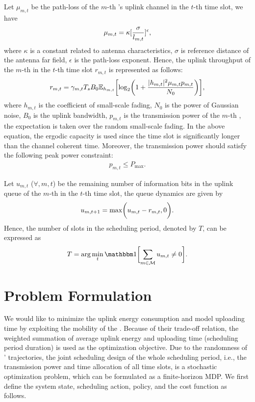 Let $\mu_{m,t}$ be the path-loss of the $m$-th {\IAV}'s uplink channel in the $t$-th time slot, we have
\begin{align*}
    \mu_{m,t} = \kappa [ \frac{ \sigma }{ l_{m,t} } ]^{\epsilon},
\end{align*}
where $\kappa$ is a constant related to antenna characteristics, $\sigma$ is reference distance of the antenna far field, $\epsilon$ is the path-loss exponent.
Hence, the uplink throughput of the $m$-th {\IAV} in the $t$-th time slot $r_{m,t}$ is represented as follows:
\begin{align}
    r_{m,t} = \gamma_{m,t} T_s B_0
    \mathbb{E}_{h_{m,t}} \Bracket{
        \log_{2}\Paren{ 1 + \frac{|h_{m,t}|^2 \mu_{m,t} p_{m,t}}{N_0} }
    },
    \label{eqn:vu}
\end{align}
where $h_{m,t}$ is the coefficient of small-scale fading, $N_0$ is the power of Gaussian noise, $B_0$ is the uplink bandwidth, $p_{m,t}$ is the transmission power of the $m$-th {\IAV}, the expectation is taken over the random small-scale fading.
In the above equation, the ergodic capacity is used since the time slot is significantly longer than the channel coherent time.
Moreover, the transmission power should satisfy the following peak power constraint:
\begin{align*}
    p_{m,t} \leq P_{\max}.
\end{align*}

Let $u_{m,t}$ ($\forall, m,t$) be the remaining number of information bits in the uplink queue of the $m$-th {\IAV} in the $t$-th time slot, the queue dynamics are given by
\begin{align*}
    u_{m,t+1} = \max\Paren{ u_{m,t} - r_{m,t}, 0 }.
\end{align*}
Hence, the number of slots in the scheduling period, denoted by $T$, can be expressed as
\begin{align}
    T = \arg\min_{t} \indicator\Bracket{ \sum_{m\in\carSet} u_{m,t} \neq 0 }.
\end{align}



\section{Problem Formulation}
\label{sec:chapter2-formulation}
We would like to minimize the uplink energy consumption and model uploading time by exploiting the mobility of the {\IAVs}.
Because of their trade-off relation, the weighted summation of average uplink energy and uploading time (scheduling period duration) is used as the optimization objective.
Due to the randomness of {\IAVs}' trajectories, the joint scheduling design of the whole scheduling period, i.e., the transmission power and time allocation of all time slots, is a stochastic optimization problem, which can be formulated as a finite-horizon MDP.
We first define the system state, scheduling action, policy, and the cost function as follows.

